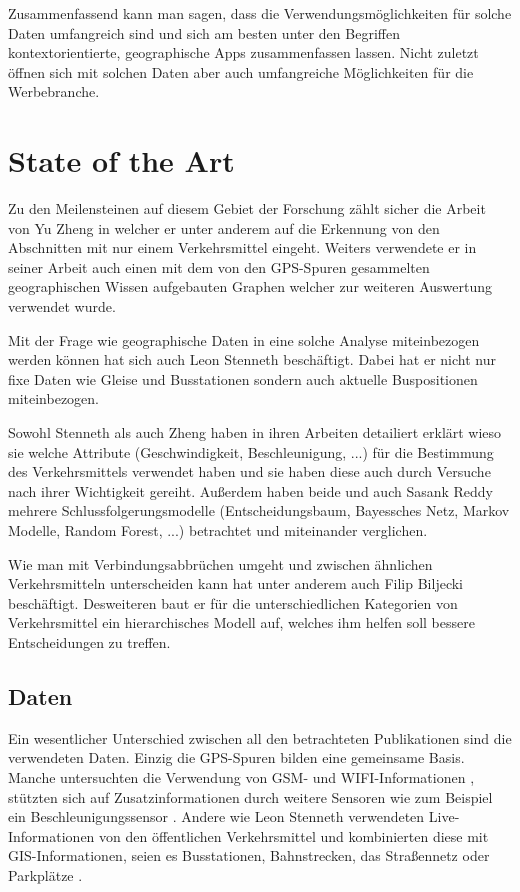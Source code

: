 Zusammenfassend kann man sagen, dass die Verwendungsmöglichkeiten für solche Daten umfangreich sind und sich am besten unter den Begriffen kontextorientierte, geographische Apps zusammenfassen lassen. Nicht zuletzt öffnen sich mit solchen Daten aber auch umfangreiche Möglichkeiten für die Werbebranche.

\section{State of the Art}
Zu den Meilensteinen auf diesem Gebiet der Forschung zählt sicher die Arbeit von Yu Zheng in welcher er unter anderem auf die Erkennung von den Abschnitten mit nur einem Verkehrsmittel eingeht. Weiters verwendete er in seiner Arbeit auch einen mit dem von den GPS-Spuren gesammelten geographischen Wissen aufgebauten Graphen welcher zur weiteren Auswertung verwendet wurde.\cite{zheng_understanding_2010}

Mit der Frage wie geographische Daten in eine solche Analyse miteinbezogen werden können hat sich auch Leon Stenneth beschäftigt. Dabei hat er nicht nur fixe Daten wie Gleise und Busstationen sondern auch aktuelle Buspositionen miteinbezogen. \cite{stenneth_transportation_2011}

Sowohl Stenneth als auch Zheng haben in ihren Arbeiten detailiert erklärt wieso sie welche Attribute (Geschwindigkeit, Beschleunigung, ...) für die Bestimmung des Verkehrsmittels verwendet haben und sie haben diese auch durch Versuche nach ihrer Wichtigkeit gereiht. Außerdem haben beide und auch Sasank Reddy mehrere Schlussfolgerungsmodelle (Entscheidungsbaum, Bayessches Netz, Markov Modelle, Random Forest, ...) betrachtet und miteinander verglichen. \cite{reddy_using_2010, stenneth_transportation_2011, zheng_understanding_2010}

Wie man mit Verbindungsabbrüchen umgeht und zwischen ähnlichen Verkehrsmitteln unterscheiden kann hat unter anderem auch Filip Biljecki beschäftigt. Desweiteren baut er für die unterschiedlichen Kategorien von Verkehrsmittel ein hierarchisches Modell auf, welches ihm helfen soll bessere Entscheidungen zu treffen. \cite{biljecki_transportation_2013}

\subsection{Daten}
Ein wesentlicher Unterschied zwischen all den betrachteten Publikationen sind die verwendeten Daten. Einzig die GPS-Spuren bilden eine gemeinsame Basis. Manche untersuchten die Verwendung von GSM- und WIFI-Informationen \cite{reddy_using_2010},  stützten sich auf Zusatzinformationen durch weitere Sensoren wie zum Beispiel ein Beschleunigungssensor \cite{reddy_using_2010, nadine_schussler_improving_2011}. Andere wie Leon Stenneth verwendeten Live-Informationen von den öffentlichen Verkehrsmittel und kombinierten diese mit GIS-Informationen, seien es Busstationen, Bahnstrecken, das Straßennetz oder Parkplätze \cite{stenneth_transportation_2011}.

